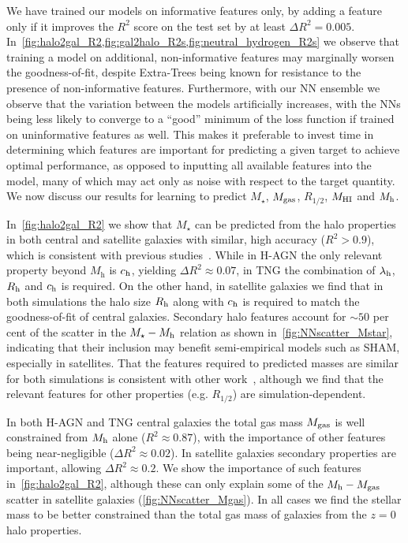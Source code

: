\documentclass[usenatbib,useAMS]{mnras}
\begin{document}
We have trained our models on informative features only, by adding a feature only if it improves the $R^2$ score on the test set
by at least $\Delta R^2 = 0.005$. In~\cref{fig:halo2gal_R2,fig:gal2halo_R2s,fig:neutral_hydrogen_R2s} we observe that training a model on additional, non-informative features may marginally worsen the goodness-of-fit, despite Extra-Trees being known for resistance to the presence of non-informative features. Furthermore, with our NN ensemble we observe that the variation between  the models artificially increases, with the NNs being less likely to converge to a ``good'' minimum of the loss function if trained on uninformative features as well. This makes it preferable to invest time in determining which features are important for predicting a given target to achieve optimal performance, as opposed to inputting all available features into the model, many of which may act only as noise with respect to the target quantity. We now discuss our results for learning to predict $M_\star$, $M_{\rm gas}$, $R_{1/2}$, $M_{\rm HI}$ and $M_{\rm h}$.

In~\cref{fig:halo2gal_R2} we show that $M_\star$ can be predicted from the halo properties in both central and satellite galaxies with similar, high accuracy ($R^2 > 0.9$), which is consistent with previous studies~\citep{Kamdar_2016,de_Santi_2022,Lovell_2021,Chen_2021}. While in H-AGN the only relevant property beyond $M_\text{h}$ is $c_{\rm h}$, yielding $\Delta R^2 \approx 0.07$, in TNG the combination of $\lambda_{\rm h}$, $R_{\rm h}$ and $c_{\rm h}$ is required. On the other hand, in satellite galaxies we find that in both simulations the halo size $R_{\rm h}$ along with $c_{\rm h}$ is required to match the goodness-of-fit of central galaxies. Secondary halo features account for $\sim50$ per cent of the scatter in the $M_\star - M_{\rm h}$ relation as shown in~\cref{fig:NNscatter_Mstar}, indicating that their inclusion may benefit semi-empirical models such as SHAM, especially in satellites. That the features required to predicted masses are similar for both simulations is consistent with other work~\citep{Villaescusa_Navarro_2021,Chen_2021}, although we find that the relevant features for other properties (e.g. $R_{1/2}$) are simulation-dependent.

In both H-AGN and TNG central galaxies the total gas mass $M_{\rm gas}$ is well constrained from $M_{\rm h}$ alone ($R^2\approx0.87$), with the importance of other features being near-negligible ($\Delta R^2\approx0.02$). In satellite galaxies secondary properties are important, allowing $\Delta R^2 \approx0.2$. We show the importance of such features in~\cref{fig:halo2gal_R2}, although these can only explain some of the $M_{\rm h}-M_{\rm gas}$ scatter in satellite galaxies (\cref{fig:NNscatter_Mgas}). In all cases we find the stellar mass to be better constrained than the total gas mass of galaxies from the $z=0$ halo properties.
\end{document}
